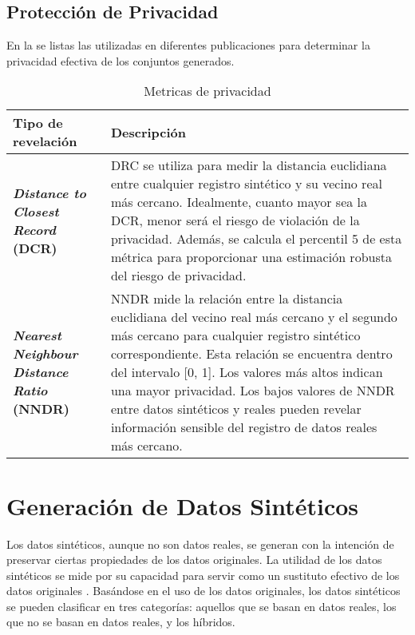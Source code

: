 \subsection{Protección de Privacidad}
En la  se listas las utilizadas en diferentes publicaciones para determinar la privacidad efectiva de los conjuntos generados.

\begin{table}[H]
	\centering
	\caption{Metricas de privacidad}
	\label{metricas-privacidad}
    \begin{tabular}{|m{15em}|m{25em}|}
    \hline
    \rowcolor[gray]{0.8}
    Tipo de revelación & Descripción \\
    \hline
    \textbf{\emph{Distance to Closest Record} (DCR)} 
    & DRC se utiliza para medir la distancia euclidiana entre cualquier registro sintético y su vecino real más cercano. Idealmente, cuanto mayor sea la DCR, menor será el riesgo de violación de la privacidad. Además, se calcula el percentil 5 de esta métrica para proporcionar una estimación robusta del riesgo de privacidad. \cite{zhao_ctab-gan_2021} \\
    \hline
    \textbf{\emph{Nearest Neighbour Distance Ratio} (NNDR)} 
    & NNDR mide la relación entre la distancia euclidiana del vecino real más cercano y el segundo más cercano para cualquier registro sintético correspondiente. Esta relación se encuentra dentro del intervalo [0, 1]. Los valores más altos indican una mayor privacidad. Los bajos valores de NNDR entre datos sintéticos y reales pueden revelar información sensible del registro de datos reales más cercano. \cite{zhao_ctab-gan_2021} \\
    \hline
    \end{tabular}
\end{table}

\newpage
\section{Generación de Datos Sintéticos}

Los datos sintéticos, aunque no son datos reales, se generan con la intención de preservar ciertas propiedades de los datos originales. La utilidad de los datos sintéticos se mide por su capacidad para servir como un sustituto efectivo de los datos originales \cite{bruce_practical_2020}. Basándose en el uso de los datos originales, los datos sintéticos se pueden clasificar en tres categorías: aquellos que se basan en datos reales, los que no se basan en datos reales, y los híbridos.

